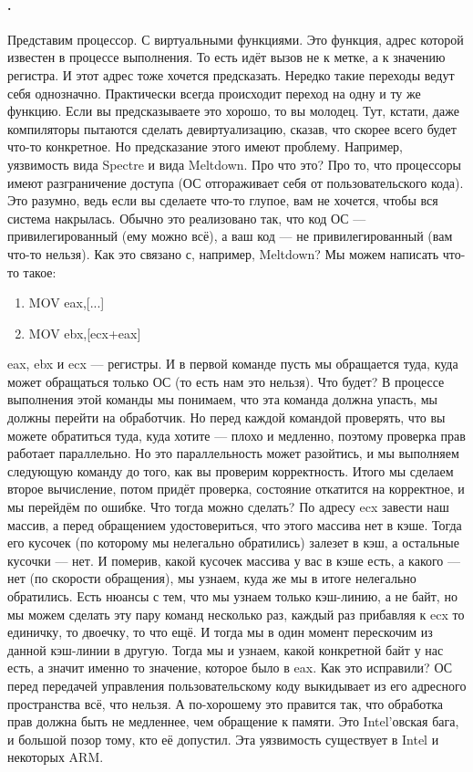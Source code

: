 \documentclass{article}
\begin{document}
    \paragraph{.}
    Представим процессор. С виртуальными функциями. Это функция, адрес которой известен в процессе выполнения. То есть идёт вызов не к метке, а к значению регистра. И этот адрес тоже хочется предсказать. Нередко такие переходы ведут себя однозначно. Практически всегда происходит переход на одну и ту же функцию.  Если вы предсказываете это хорошо, то вы молодец. Тут, кстати, даже компиляторы пытаются сделать девиртуализацию, сказав, что скорее всего будет что-то конкретное. Но предсказание этого имеют проблему. Например, уязвимость вида Spectre и вида Meltdown. Про что это? Про то, что процессоры имеют разграничение доступа (ОС отгораживает себя от пользовательского кода). Это разумно, ведь если вы сделаете что-то глупое, вам не хочется, чтобы вся система накрылась. Обычно это реализовано так, что код ОС --- привилегированный (ему можно всё), а ваш код --- не привилегированный (вам что-то нельзя). Как это связано с, например, Meltdown? Мы можем написать что-то такое:
    \begin{enumerate}
        \item MOV eax,[...]
        \item MOV ebx,[ecx+eax]
    \end{enumerate}
    eax, ebx и ecx --- регистры. И в первой команде пусть мы обращается туда, куда может обращаться только ОС (то есть нам это нельзя). Что будет? В процессе выполнения этой команды мы понимаем, что эта команда должна упасть, мы должны перейти на обработчик. Но перед каждой командой проверять, что вы можете обратиться туда, куда хотите --- плохо и медленно, поэтому проверка прав работает параллельно. Но это параллельность может разойтись, и мы выполняем следующую команду до того, как вы проверим корректность. Итого мы сделаем второе вычисление, потом придёт проверка, состояние откатится на корректное, и мы перейдём по ошибке. Что тогда можно сделать? По адресу ecx завести наш массив, а перед обращением удостовериться, что этого массива нет в кэше. Тогда его кусочек (по которому мы нелегально обратились) залезет в кэш, а остальные кусочки --- нет. И померив, какой кусочек массива у вас в кэше есть, а какого --- нет (по скорости обращения), мы узнаем, куда же мы в итоге нелегально обратились. Есть нюансы с тем, что мы узнаем только кэш-линию, а не байт, но мы можем сделать эту пару команд несколько раз, каждый раз прибавляя к ecx то единичку, то двоечку, то что ещё. И тогда мы в один момент перескочим из данной кэш-линии в другую. Тогда мы и узнаем, какой конкретной байт у нас есть, а значит именно то значение, которое было в eax. Как это исправили? ОС перед передачей управления пользовательскому коду выкидывает из его адресного пространства всё, что нельзя. А по-хорошему это правится так, что обработка прав должна быть не медленнее, чем обращение к памяти. Это Intel'овская бага, и большой позор тому, кто её допустил. Эта уязвимость существует в Intel и некоторых ARM.\\
\end{document}

